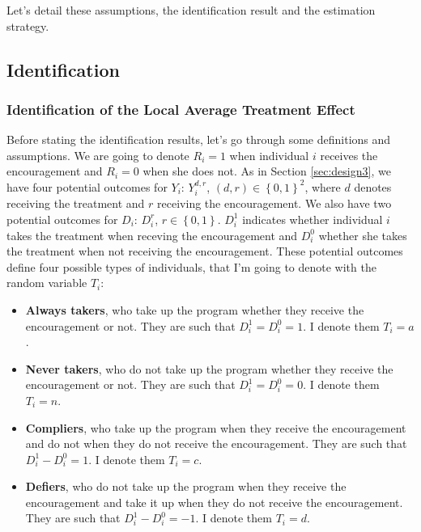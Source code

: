 \documentclass[
]{book}
\providecommand{\tightlist}{%
  \setlength{\itemsep}{0pt}\setlength{\parskip}{0pt}}
\theoremstyle{definition}
\theoremstyle{definition}
\theoremstyle{definition}
\theoremstyle{definition}
\theoremstyle{remark}
\begin{document}
Let's detail these assumptions, the identification result and the estimation strategy.

\hypertarget{identification-3}{%
\subsection{Identification}\label{identification-3}}

\hypertarget{identification-of-the-local-average-treatment-effect}{%
\subsubsection{Identification of the Local Average Treatment Effect}\label{identification-of-the-local-average-treatment-effect}}

Before stating the identification results, let's go through some definitions and assumptions.
We are going to denote \(R_i=1\) when individual \(i\) receives the encouragement and \(R_i=0\) when she does not.
As in Section \ref{sec:design3}, we have four potential outcomes for \(Y_i\): \(Y_i^{d,r}\), \((d,r)\in\left\{0,1\right\}^2\), where \(d\) denotes receiving the treatment and \(r\) receiving the encouragement.
We also have two potential outcomes for \(D_i\): \(D_i^{r}\), \(r\in\left\{0,1\right\}\).
\(D_i^{1}\) indicates whether individual \(i\) takes the treatment when receving the encouragement and \(D_i^{0}\) whether she takes the treatment when not receiving the encouragement.
These potential outcomes define four possible types of individuals, that I'm going to denote with the random variable \(T_i\):

\begin{itemize}
\tightlist
\item
  \textbf{Always takers}, who take up the program whether they receive the encouragement or not.
  They are such that \(D_i^{1}=D_i^{0}=1\).
  I denote them \(T_i=a\).
\item
  \textbf{Never takers}, who do not take up the program whether they receive the encouragement or not.
  They are such that \(D_i^{1}=D_i^{0}=0\).
  I denote them \(T_i=n\).
\item
  \textbf{Compliers}, who take up the program when they receive the encouragement and do not when they do not receive the encouragement.
  They are such that \(D_i^{1}-D_i^{0}=1\).
  I denote them \(T_i=c\).
\item
  \textbf{Defiers}, who do not take up the program when they receive the encouragement and take it up when they do not receive the encouragement.
  They are such that \(D_i^{1}-D_i^{0}=-1\).
  I denote them \(T_i=d\).
\end{itemize}
\end{document}

